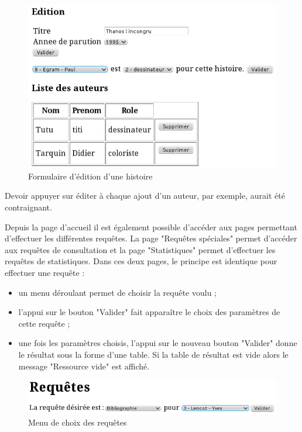 \documentclass[12pt]{article}
\begin{document}
\begin{figure}[h!]
\begin{center}
\noindent\includegraphics[]{formulaire-edition-histoire}
  \caption{Formulaire d'édition d'une histoire}
\end{center}
\end{figure}

Devoir appuyer sur éditer à chaque ajout d'un auteur, par exemple, aurait été
contraignant.

Depuis la page d'accueil il est également possible d'accéder aux pages
permettant d'effectuer les différentes requêtes. La page "Requêtes spéciales"
permet d'accéder aux requêtes de consultation et la page "Statistiques" permet
d'effectuer les requêtes de statistiques. Dans ces deux pages, le principe est
identique pour effectuer une requête : 
\begin{itemize}
	\item un menu déroulant permet de choisir la requête voulu ;
	\item l'appui sur le bouton "Valider" fait apparaître le choix des paramètres de cette
		requête ;
	\item une fois les paramètres choisis, l'appui sur le nouveau bouton
		"Valider" donne le résultat sous la forme d'une table. Si la table de
		résultat est vide alors le message "Ressource vide" est affiché.
\end{itemize}

\begin{figure}[h!]
\begin{center}
\noindent\includegraphics[]{choix-requete}
  \caption{Menu de choix des requêtes}
\end{center}
\end{figure}
\end{document}
